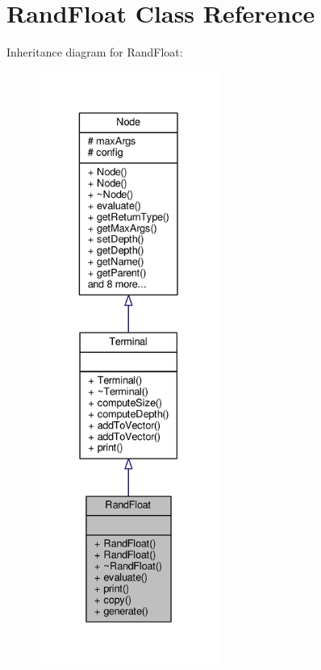 \hypertarget{classRandFloat}{}\section{Rand\+Float Class Reference}
\label{classRandFloat}


Inheritance diagram for Rand\+Float\+:
\nopagebreak
\begin{figure}[H]
\begin{center}
\leavevmode
\includegraphics[height=550pt]{classRandFloat__inherit__graph}
\end{center}
\end{figure}


